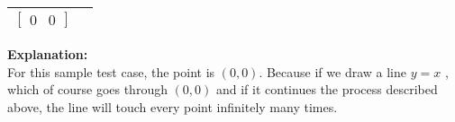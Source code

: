 \documentclass[12pt,paper=a4,answers]{exam}
\begin{document}
\begin{questions}
\begin{center}
\begin{tabular}{|c|c|}
$
\begin{bmatrix}
0 & 0
\end{bmatrix}
$ \\
\hline
\end{tabular}
\end{center}

\textbf{Explanation:} \\
For this sample test case, the point is $(0, 0)$. Because if we draw a line $y = x$ , which of course goes through $(0,0)$ and if it continues the process described above, the line will touch every point infinitely many times.
\\
\droppoints
\newpage

\end{questions}
\end{document}
